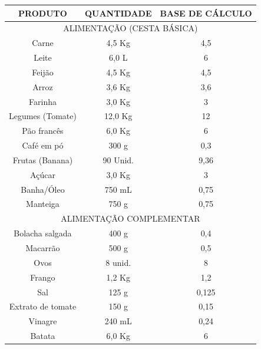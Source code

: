 \documentclass{ifto-tex}
\begin{document}
	\begin{longtable}{|c|c|c|} 
	\hline
	PRODUTO           & QUANTIDADE         & BASE DE CÁLCULO \\
	\hline
	\multicolumn{3}{|c|}{ALIMENTAÇÃO (CESTA BÁSICA)}                         \\
	\hline
	Carne             & 4,5 Kg             & 4,5             \\
	\hline
	Leite             & 6,0 L              & 6               \\
	\hline
	Feijão            & 4,5 Kg             & 4,5             \\
	\hline
	Arroz             & 3,6 Kg             & 3,6             \\
	\hline
	Farinha           & 3,0 Kg             & 3               \\
	\hline
	Legumes (Tomate)  & 12,0 Kg            & 12              \\
	\hline
	Pão francês       & 6,0 Kg             & 6               \\
	\hline
	Café em pó        & 300 g              & 0,3             \\
	\hline
	Frutas (Banana)   & 90 Unid.           & 9,36            \\
	\hline
	Açúcar            & 3,0 Kg             & 3               \\
	\hline
	Banha/Óleo        & 750 mL             & 0,75            \\
	\hline
	Manteiga          & 750 g              & 0,75            \\
	\hline
	\multicolumn{3}{|c|}{ALIMENTAÇÃO COMPLEMENTAR}             \\
	\hline
	Bolacha salgada   & 400 g              & 0,4             \\
	\hline
	Macarrão          & 500 g              & 0,5             \\
	\hline
	Ovos              & 8 unid.            & 8            \\
	\hline
	Frango            & 1,2 Kg             & 1,2             \\
	\hline
	Sal               & 125 g              & 0,125           \\
	\hline
	Extrato de tomate & 150 g              & 0,15            \\
	\hline
	Vinagre           & 240 mL             & 0,24            \\
	\hline
	Batata            & 6,0 Kg             & 6               \\

\end{longtable}
\end{document}
